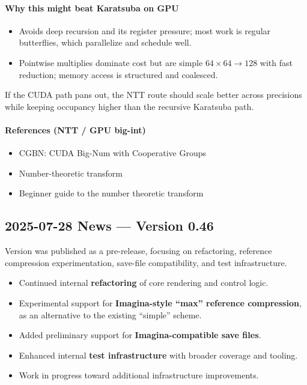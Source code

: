 \paragraph{Why this might beat Karatsuba on GPU}

\begin{itemize}

\item Avoids deep recursion and its register pressure; most work is regular 
butterflies, which parallelize and schedule well.

\item Pointwise multiplies dominate cost but are simple $64\times 64 \rightarrow
 128$ with fast reduction; memory access is structured and coalesced.

\end{itemize}

If the CUDA path pans out, the NTT route should scale better across precisions 
while keeping occupancy higher than the recursive Karatsuba path.

\paragraph{References (NTT / GPU big-int)}
\begin{itemize}
\item CGBN: CUDA Big-Num with Cooperative Groups \cite{CGBN_NVlabs}
\item Number-theoretic transform \cite{NTT_Wikipedia}
\item Beginner guide to the number theoretic transform \cite{NTT_BeginnerGuide2024}
\end{itemize}


\subsection{2025-07-28 News --- Version 0.46}

Version  was published as a pre-release, focusing on refactoring,
reference compression experimentation, save-file compatibility, and test infrastructure.

\begin{itemize}

  \item Continued internal \textbf{refactoring} of core rendering and control logic.
  
  \item Experimental support for \textbf{Imagina-style “max” reference compression},
        as an alternative to the existing “simple” scheme.
  
  \item Added preliminary support for \textbf{Imagina-compatible save files}.

  \item Enhanced internal \textbf{test infrastructure} with broader coverage and tooling.
    
  \item Work in progress toward additional infrastructure improvements.

\end{itemize}

